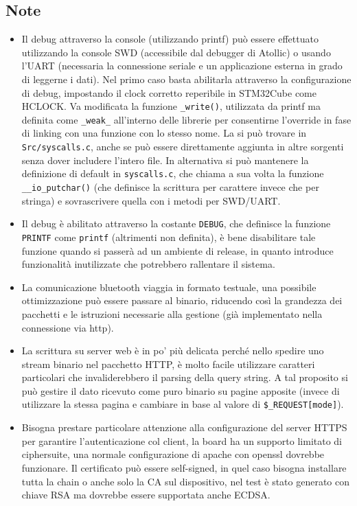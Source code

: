\newpage

\subsection{Note}
\begin{itemize}
  \item Il debug attraverso la console (utilizzando printf) pu\`o essere effettuato utilizzando la console SWD (accessibile dal debugger di Atollic) o usando l'UART (necessaria la connessione seriale e un applicazione esterna in grado di leggerne i dati). Nel primo caso basta abilitarla attraverso la configurazione di debug, impostando il clock corretto reperibile in STM32Cube come HCLOCK. Va modificata la funzione \texttt{\_write()}, utilizzata da printf ma definita come \texttt{\_weak\_} all'interno delle librerie per consentirne l'override in fase di linking con una funzione con lo stesso nome. La si pu\`o trovare in \texttt{Src/syscalls.c}, anche se pu\`o essere direttamente aggiunta in altre sorgenti senza dover includere l'intero file. In alternativa si pu\`o mantenere la definizione di default in \texttt{syscalls.c}, che chiama a sua volta la funzione \texttt{\_\_io\_putchar()} (che definisce la scrittura per carattere invece che per stringa) e sovrascrivere quella con i metodi per SWD/UART.
  \item Il debug \`e abilitato attraverso la costante \texttt{DEBUG}, che definisce la funzione \texttt{PRINTF} come \texttt{printf} (altrimenti non definita), \`e bene disabilitare tale funzione quando si passer\`a ad un ambiente di release, in quanto introduce funzionalit\`a inutilizzate che potrebbero rallentare il sistema.
  \item La comunicazione bluetooth viaggia in formato testuale, una possibile ottimizzazione pu\`o essere passare al binario, riducendo cos\`i la grandezza dei pacchetti e le istruzioni necessarie alla gestione (gi\`a implementato nella connessione via http).
  \item La scrittura su server web \`e in po' pi\`u delicata perch\'e nello spedire uno stream binario nel pacchetto HTTP, \`e molto facile utilizzare caratteri particolari che invaliderebbero il parsing della query string. A tal proposito si pu\`o gestire il dato ricevuto come puro binario su pagine apposite (invece di utilizzare la stessa pagina e cambiare in base al valore di \texttt{\$\_REQUEST[mode]}).
  \item Bisogna prestare particolare attenzione alla configurazione del server HTTPS per garantire l'autenticazione col client, la board ha un supporto limitato di ciphersuite, una normale configurazione di apache con openssl dovrebbe funzionare. Il certificato pu\`o essere self-signed, in quel caso bisogna installare tutta la chain o anche solo la CA sul dispositivo, nel test \`e stato generato con chiave RSA ma dovrebbe essere supportata anche ECDSA.

\end{itemize}
